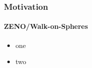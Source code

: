 

\begin{frame}
  \frametitle{Motivation}
  \framesubtitle{ZENO/Walk-on-Spheres}

  \begin{itemize}
    \item one
    \item two
  \end{itemize}

\end{frame}

